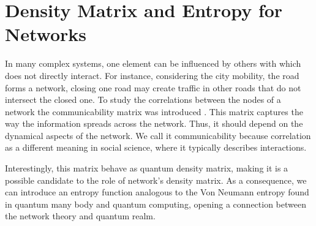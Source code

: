 \chapter{Density Matrix and Entropy for Networks}\label{C_Density_Matrix}

In many complex systems, one element can be influenced by others with which does not directly interact. For instance, considering the city mobility, the road forms a network, closing one road may create traffic in other roads that do not intersect the closed one. To study the correlations between the nodes of a network the communicability matrix was introduced \cite{Estrada_2008}. 
This matrix captures the way the information spreads across the network. Thus, it should depend on the dynamical aspects of the network.
We call it communicability because correlation as a different meaning in social science, where it typically describes interactions.

Interestingly, this matrix behave as quantum density matrix, making it is a possible candidate to the role of network's density matrix. As a consequence, we can introduce an entropy function analogous to the Von Neumann entropy found in quantum many body and quantum computing, opening a connection between the network theory and quantum realm.



